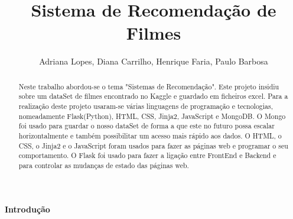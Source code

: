 

\title{Sistema de Recomendação de Filmes}

\author{Adriana Lopes, Diana Carrilho, Henrique Faria, Paulo Barbosa}





\maketitle

\begin{abstract}
Neste trabalho abordou-se o tema "Sistemas de Recomendação". Este projeto insidiu sobre um dataSet de filmes encontrado no Kaggle e guardado em ficheiros excel. Para a realização deste projeto usaram-se várias linguagens de programação e tecnologias, nomeadamente Flask(Python), HTML, CSS, Jinja2, JavaScript e MongoDB. O Mongo foi usado para guardar o nosso dataSet de forma a que este no futuro possa escalar horizontalmente e também possibilitar um acesso mais rápido aos dados. O HTML, o CSS, o Jinja2 e o JavaScript foram usados para fazer as páginas web e programar o seu comportamento. O Flask foi usado para fazer a ligação entre FrontEnd e Backend e para controlar as mudanças de estado das páginas web. 
\newline

\end{abstract}


\begin{center}
\normalsize{\bfseries Introdução}\hfill 
\end{center}

